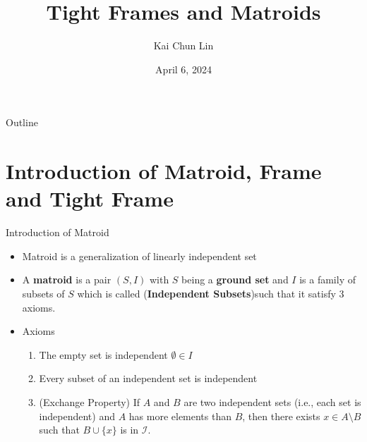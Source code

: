\documentclass{beamer}
\title[Tight Frames and Matroids]{Tight Frames and Matroids}
\author{Kai Chun Lin}
\institute{Rose-Hulman Institute of Technology}
\date{ April 6, 2024}
\begin{document}
\begin{frame}
  \titlepage
\end{frame}

\begin{frame}{Outline}
  \tableofcontents
\end{frame}


\section{Introduction of Matroid, Frame and Tight Frame}
\begin{frame}{Introduction of Matroid}
 \begin{itemize}
    \item <1- >Matroid is a generalization of linearly independent set
    \item <2- > A \textbf{matroid} is a pair $(S,I)$ with $S$ being a \textbf{ground set} and $I$ is a family of subsets of $S$  which is called (\textbf{Independent Subsets})such that it satisfy 3 axioms.
    \item <3- > Axioms
        \begin{enumerate}
            \item <4- > The empty set is independent $\emptyset \in \textit{I}$
        \item <5- > Every subset of an independent set is independent
        \item <6- > (Exchange Property) If $A$ and $B$ are two independent sets (i.e., each set is independent) and $A$ has more elements than $B$, then there exists $x \in A \setminus B$ such that $B \cup \{x\}$ is in $\mathcal{I}$.
        \cite{oxley2003matroid}

        \end{enumerate}
        
  \end{itemize}
\end{frame}
\end{document}
